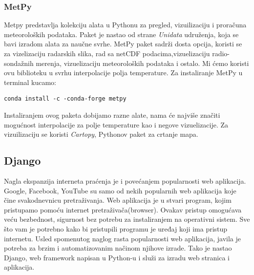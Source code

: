 \documentclass[12pt]{article}
\begin{document}
\subsubsection{MetPy}
Metpy predstavlja kolekciju alata u Pythonu za pregled, vizuilizaciju i proračuna meteoroloških podataka. Paket je nastao od strane \textsl{Unidata} udruženja, koja se bavi izradom alata za naučne svrhe. MetPy paket sadrži dosta opcija, koristi se za vizelizaciju radarskih slika, rad sa netCDF podacima,vizuelizaciju radio-sondažnih merenja, vizuelizaciju meteoroloških podataka i ostalo. Mi ćemo koristi ovu biblioteku u svrhu interpolacije polja temperature. Za instaliranje MetPy u terminal kucamo:
\begin{lstlisting}
conda install -c -conda-forge metpy
\end{lstlisting}
Instaliranjem ovog paketa dobijamo razne alate, nama će najviše značiti mogućnost interpolacije za polje temperature kao i negove vizuelizacije. Za vizuilizaciju se koristi \textsl{Cartopy}, Pythonov paket za crtanje mapa.



\subsection{Django}

Nagla ekspanzija interneta praćenja je i povećanjem popularnosti web aplikacija. Google, Facebook, YouTube su samo od nekih popularnih web aplikacija koje čine svakodnevnicu pretraživanja. Web aplikacija je u stvari program, kojim pristupamo pomoću internet pretraživača(browser). Ovakav pristup omogućava veću bezbednost, sigurnost bez potrebu za instaliranjem na operativni sistem. Sve što vam je potrebno kako bi pristupili programu je uređaj koji ima pristup internetu. 
Usled spomenutog naglog rasta popularnosti web aplikacija, javila je potreba za brzim i automatizovanim načinom njihove izrade. Tako je nastao Django, web framework napisan u Python-u i služi za izradu web stranica i aplikacija. 
\end{document}
